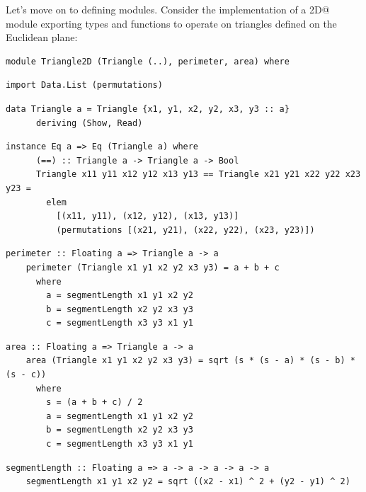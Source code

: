 \documentclass[UdineBachThesis,american,11pt,draft]{PhdThesis}
\begin{document}
  Let's move on to defining modules. Consider the implementation of a
  \lstinline@Triangle2D@ module exporting types and functions to operate on
  triangles defined on the Euclidean plane:

  \begin{lstlisting}[gobble=4,basicstyle=\ttfamily\small]
    module Triangle2D (Triangle (..), perimeter, area) where
  \end{lstlisting}

  \begin{lstlisting}[gobble=4,basicstyle=\ttfamily\small]
    import Data.List (permutations)
  \end{lstlisting}

  \begin{lstlisting}[gobble=4,basicstyle=\ttfamily\small]
    data Triangle a = Triangle {x1, y1, x2, y2, x3, y3 :: a}
      deriving (Show, Read)
  \end{lstlisting}

  \begin{lstlisting}[gobble=4,basicstyle=\ttfamily\small]
    instance Eq a => Eq (Triangle a) where
      (==) :: Triangle a -> Triangle a -> Bool
      Triangle x11 y11 x12 y12 x13 y13 == Triangle x21 y21 x22 y22 x23 y23 =
        elem
          [(x11, y11), (x12, y12), (x13, y13)]
          (permutations [(x21, y21), (x22, y22), (x23, y23)])
  \end{lstlisting}

  \begin{lstlisting}[gobble=4,basicstyle=\ttfamily\small]
    perimeter :: Floating a => Triangle a -> a
    perimeter (Triangle x1 y1 x2 y2 x3 y3) = a + b + c
      where
        a = segmentLength x1 y1 x2 y2
        b = segmentLength x2 y2 x3 y3
        c = segmentLength x3 y3 x1 y1
  \end{lstlisting}

  \begin{lstlisting}[gobble=4,basicstyle=\ttfamily\small]
    area :: Floating a => Triangle a -> a
    area (Triangle x1 y1 x2 y2 x3 y3) = sqrt (s * (s - a) * (s - b) * (s - c))
      where
        s = (a + b + c) / 2
        a = segmentLength x1 y1 x2 y2
        b = segmentLength x2 y2 x3 y3
        c = segmentLength x3 y3 x1 y1
  \end{lstlisting}

  \begin{lstlisting}[gobble=4,basicstyle=\ttfamily\small]
    segmentLength :: Floating a => a -> a -> a -> a -> a
    segmentLength x1 y1 x2 y2 = sqrt ((x2 - x1) ^ 2 + (y2 - y1) ^ 2)
  \end{lstlisting}
\end{document}
